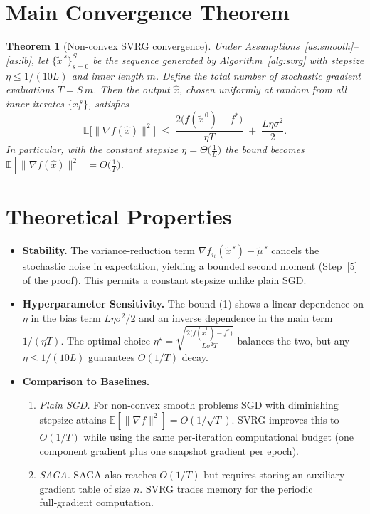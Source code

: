 \documentclass[11pt]{article}
\newtheorem{theorem}{Theorem}
\newcommand{\EE}{\mathbb{E}}
\newcommand{\grad}{\nabla}
\begin{document}
\section*{Main Convergence Theorem}
\begin{theorem}[Non‑convex SVRG convergence]\label{thm:svrg}
Under Assumptions~\ref{as:smooth}–\ref{as:lb}, let $\{ \tilde{x}^{\,s}\}_{s=0}^{S}$ be the sequence generated by Algorithm~\ref{alg:svrg} with stepsize $\eta\le1/(10L)$ and inner length $m$. Define the total number of stochastic gradient evaluations $T=S\,m$. Then the output $\hat{x}$, chosen uniformly at random from all inner iterates $\{x_t^{\,s}\}$, satisfies
\[
\EE\!\big[\|\grad f(\hat{x})\|^{2}\big]
\;\le\;
\frac{2\big(f(\tilde{x}^{\,0})-f^{*}\big)}{\eta T}
\;+\;
\frac{L\eta\sigma^{2}}{2}.
\tag{1}
\]
In particular, with the constant stepsize $\eta=\Theta\!\big(\frac{1}{L}\big)$ the bound becomes $\EE[\|\grad f(\hat{x})\|^{2}]=O\!\big(\frac{1}{T}\big)$.
\end{theorem}

\section*{Theoretical Properties}
\begin{itemize}[leftmargin=*]
\item \textbf{Stability.} The variance‑reduction term $\grad f_{i_t}(\tilde{x}^{\,s})-\tilde\mu^{\,s}$ cancels the stochastic noise in expectation, yielding a bounded second moment (Step~[5] of the proof). This permits a constant stepsize unlike plain SGD.
\item \textbf{Hyperparameter Sensitivity.} The bound (1) shows a linear dependence on $\eta$ in the bias term $L\eta\sigma^{2}/2$ and an inverse dependence in the main term $1/(\eta T)$. The optimal choice $\eta^{\star}= \sqrt{\frac{2\big(f(\tilde{x}^{0})-f^{*}\big)}{L\sigma^{2}T}}$ balances the two, but any $\eta\le 1/(10L)$ guarantees $O(1/T)$ decay.
\item \textbf{Comparison to Baselines.}
    \begin{enumerate}
        \item \emph{Plain SGD.} For non‑convex smooth problems SGD with diminishing stepsize attains $\EE[\|\grad f\|^{2}]=O(1/\sqrt{T})$. SVRG improves this to $O(1/T)$ while using the same per‑iteration computational budget (one component gradient plus one snapshot gradient per epoch).
        \item \emph{SAGA.} SAGA also reaches $O(1/T)$ but requires storing an auxiliary gradient table of size $n$. SVRG trades memory for the periodic full‑gradient computation.
    \end{enumerate}
\end{itemize}
\end{document}
